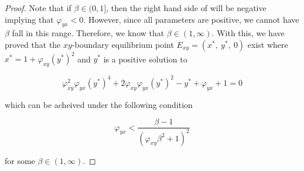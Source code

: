 \begin{proof}
    Note that if $\beta\in(0, 1]$, then the right hand side of  will be negative implying that $\varphi_{yx}<0$. However, since all parameters are positive, we cannot have $\beta$ fall in this range. Therefore, we know that $\beta\in\left(1,\infty\right)$. With this, we have proved that the $xy$-boundary equilibrium point $E_{xy}=\left(x^*,\ y^*,\ 0\right)$ exist where $x^*=1+\varphi_{xy}\left(y^*\right)^2$ and $y^*$ is a positive solution to

    \begin{equation*}
        \varphi_{xy}^2\varphi_{yx}\left(y^*\right)^4+2\varphi_{xy}\varphi_{yx}\left(y^*\right)^2-y^*+\varphi_{yx}+1=0
    \end{equation*}

    which can be acheived under the following condition
    
    \begin{equation*}
        \varphi_{yx}<\frac{\beta-1}{\left(\varphi_{xy}\beta^2+1\right)^2}
    \end{equation*}
    
    for some $\beta\in\left(1, \infty\right)$.
\end{proof}

